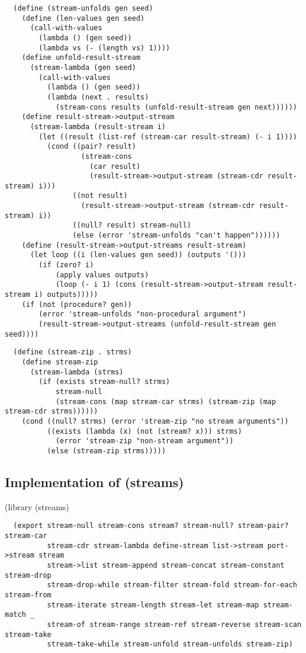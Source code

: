 \begin{verbatim}
  (define (stream-unfolds gen seed)
    (define (len-values gen seed)
      (call-with-values
        (lambda () (gen seed))
        (lambda vs (- (length vs) 1))))
    (define unfold-result-stream
      (stream-lambda (gen seed)
        (call-with-values
          (lambda () (gen seed))
          (lambda (next . results)
            (stream-cons results (unfold-result-stream gen next))))))
    (define result-stream->output-stream
      (stream-lambda (result-stream i)
        (let ((result (list-ref (stream-car result-stream) (- i 1))))
          (cond ((pair? result)
                  (stream-cons
                    (car result)
                    (result-stream->output-stream (stream-cdr result-stream) i)))
                ((not result)
                  (result-stream->output-stream (stream-cdr result-stream) i))
                ((null? result) stream-null)
                (else (error 'stream-unfolds "can't happen"))))))
    (define (result-stream->output-streams result-stream)
      (let loop ((i (len-values gen seed)) (outputs '()))
        (if (zero? i)
            (apply values outputs)
            (loop (- i 1) (cons (result-stream->output-stream result-stream i) outputs)))))
    (if (not (procedure? gen))
        (error 'stream-unfolds "non-procedural argument")
        (result-stream->output-streams (unfold-result-stream gen seed))))
\end{verbatim}

\begin{verbatim}
  (define (stream-zip . strms)
    (define stream-zip
      (stream-lambda (strms)
        (if (exists stream-null? strms)
            stream-null
            (stream-cons (map stream-car strms) (stream-zip (map stream-cdr strms))))))
    (cond ((null? strms) (error 'stream-zip "no stream arguments"))
          ((exists (lambda (x) (not (stream? x))) strms)
            (error 'stream-zip "non-stream argument"))
          (else (stream-zip strms)))))
\end{verbatim}

\subsection{Implementation of
(streams)}\label{implementation-of-streams}

(library (streams)

\begin{verbatim}
  (export stream-null stream-cons stream? stream-null? stream-pair? stream-car
          stream-cdr stream-lambda define-stream list->stream port->stream stream
          stream->list stream-append stream-concat stream-constant stream-drop
          stream-drop-while stream-filter stream-fold stream-for-each stream-from
          stream-iterate stream-length stream-let stream-map stream-match _
          stream-of stream-range stream-ref stream-reverse stream-scan stream-take
          stream-take-while stream-unfold stream-unfolds stream-zip)
\end{verbatim}

